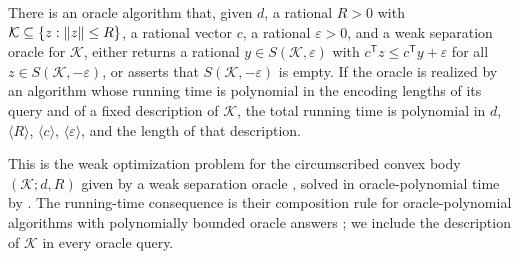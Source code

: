 \begin{lemma}\label{lem:points-gls}
There is an oracle algorithm that, given $d$, a rational $R>0$ with
$\mathcal K\subseteq\{z:\left\lVert z\right\rVert\le R\}$, a rational vector $c$, a rational
$\varepsilon>0$, and a weak separation oracle for $\mathcal K$, either
returns a rational $y\in S(\mathcal K,\varepsilon)$ with
$c^{\mathsf T}z\le c^{\mathsf T}y+\varepsilon$ for all
$z\in S(\mathcal K,-\varepsilon)$, or asserts that
$S(\mathcal K,-\varepsilon)$ is empty. If the oracle is realized by an
algorithm whose running time is polynomial in the encoding lengths of its
query and of a fixed description of $\mathcal K$, the total running time is
polynomial in $d$, $\langle R\rangle$, $\langle c\rangle$,
$\langle\varepsilon\rangle$, and the length of that description.
\end{lemma}

This is the weak optimization problem \citep[(2.1.10)]{GroetschelLovaszSchrijver1988}
for the circumscribed convex body $(\mathcal K;d,R)$ given by a weak
separation oracle \citep[(2.1.13), (2.1.16)]{GroetschelLovaszSchrijver1988},
solved in oracle-polynomial time by
\citet[Corollary~(4.2.7)]{GroetschelLovaszSchrijver1988}. The running-time
consequence is their composition rule for oracle-polynomial algorithms with
polynomially bounded oracle answers
\citep[(1.2.1) and Section~4.1]{GroetschelLovaszSchrijver1988}; we include
the description of $\mathcal K$ in every oracle query.

